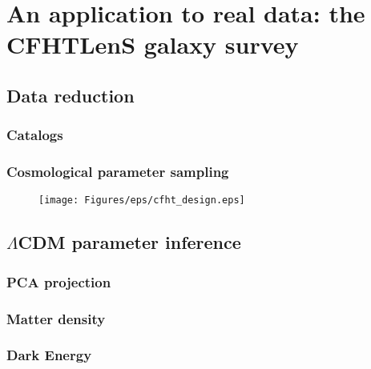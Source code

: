 
\chapter{An application to real data: the CFHTLenS galaxy survey}
\lhead[\fancyplain{}{\thepage}]{\fancyplain{}{\rightmark}}
 \thispagestyle{plain}
\setlength{\parindent}{10mm}

\label{chp:6}

\section{Data reduction}

\subsection{Catalogs}
\subsection{Cosmological parameter sampling}

\begin{figure}
\begin{center}
\texttt{[image: Figures/eps/cfht\_design.eps]}
\end{center}
\caption{}
\label{fig:6:sampling}
\end{figure}

\section{$\Lambda$CDM parameter inference}

\subsection{PCA projection}

\subsection{Matter density}

\subsection{Dark Energy}


%